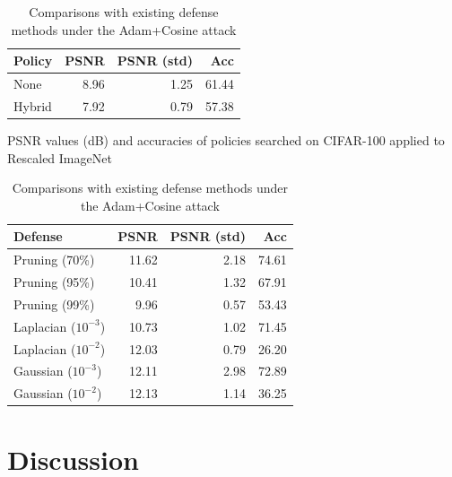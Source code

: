 \begin{table}[htb]
    \begin{minipage}{.4\linewidth}
    \centering
    \begin{tabular}{lrrr}
        \hline
         Policy   &   PSNR &   PSNR (std) &   Acc \\
        \hline
         None     &        8.96 &       1.25 & 61.44 \\
         Hybrid   &        7.92 &       0.79 & 57.38 \\
        \hline
    \end{tabular}
    \caption{PSNR values (dB) and accuracies of policies searched on CIFAR-100 applied to Rescaled ImageNet}
    \label{tab:ext1}
    \end{minipage}
    \hfill
    \begin{minipage}{.6\linewidth}
    \centering
        \begin{tabular}{lrrr}
        \hline
         Defense               &   PSNR &   PSNR (std) &   Acc \\
        \hline
         Pruning (70\%)         &       11.62 &       2.18 & 74.61 \\
         Pruning (95\%)         &       10.41 &       1.32 & 67.91 \\
         Pruning (99\%)         &        9.96 &       0.57 & 53.43 \\
         Laplacian ($10^{-3}$) &       10.73 &       1.02 & 71.45 \\
         Laplacian ($10^{-2}$) &       12.03 &       0.79 & 26.20 \\
         Gaussian ($10^{-3}$)  &       12.11 &       2.98 & 72.89 \\
         Gaussian ($10^{-2}$)  &       12.13 &       1.14 & 36.25 \\
        \hline
    \end{tabular}
    \caption{Comparisons with existing defense methods under the Adam+Cosine attack}
    \label{tab:3}
    \end{minipage}
    \vspace{-8mm}
\end{table}

\section{Discussion}
\label{sec:discussion}

